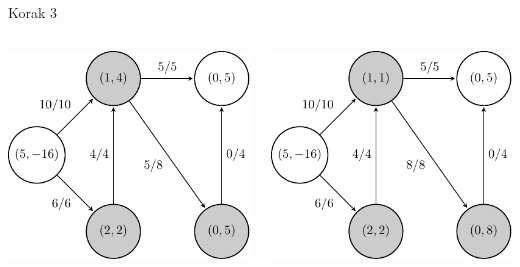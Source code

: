 \documentclass{beamer}
\begin{document}
\begin{frame}{Korak 3}
    \begin{columns}
        \begin{column}{0.5\textwidth}
            \centering
            \includegraphics[scale=0.7]{../writing/images/graf2-4.pdf}
        \end{column}
        \pause
        \begin{column}{0.5\textwidth}
            \centering
            \includegraphics[scale=0.7]{../writing/images/graf2-5.pdf}
        \end{column}
    \end{columns}
\end{frame}
\end{document}
